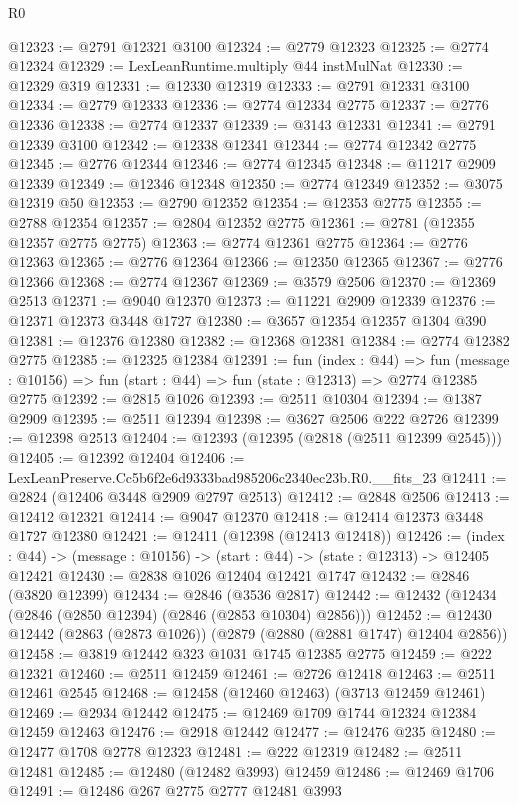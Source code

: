 \begin{lexlean}{R0}
\begin{coremodule}
@12323 := @2791 @12321 @3100
@12324 := @2779 @12323
@12325 := @2774 @12324
@12329 := LexLeanRuntime.multiply @44 instMulNat
@12330 := @12329 @319
@12331 := @12330 @12319
@12333 := @2791 @12331 @3100
@12334 := @2779 @12333
@12336 := @2774 @12334 @2775
@12337 := @2776 @12336
@12338 := @2774 @12337
@12339 := @3143 @12331
@12341 := @2791 @12339 @3100
@12342 := @12338 @12341
@12344 := @2774 @12342 @2775
@12345 := @2776 @12344
@12346 := @2774 @12345
@12348 := @11217 @2909 @12339
@12349 := @12346 @12348
@12350 := @2774 @12349
@12352 := @3075 @12319 @50
@12353 := @2790 @12352
@12354 := @12353 @2775
@12355 := @2788 @12354
@12357 := @2804 @12352 @2775
@12361 := @2781 (@12355 @12357 @2775 @2775)
@12363 := @2774 @12361 @2775
@12364 := @2776 @12363
@12365 := @2776 @12364
@12366 := @12350 @12365
@12367 := @2776 @12366
@12368 := @2774 @12367
@12369 := @3579 @2506
@12370 := @12369 @2513
@12371 := @9040 @12370
@12373 := @11221 @2909 @12339
@12376 := @12371 @12373 @3448 @1727
@12380 := @3657 @12354 @12357 @1304 @390
@12381 := @12376 @12380
@12382 := @12368 @12381
@12384 := @2774 @12382 @2775
@12385 := @12325 @12384
@12391 := fun (index : @44) =>
  fun (message : @10156) => fun (start : @44) => fun (state : @12313) => @2774 @12385 @2775
@12392 := @2815 @1026
@12393 := @2511 @10304
@12394 := @1387 @2909
@12395 := @2511 @12394
@12398 := @3627 @2506 @222 @2726
@12399 := @12398 @2513
@12404 := @12393 (@12395 (@2818 (@2511 @12399 @2545)))
@12405 := @12392 @12404
@12406 := LexLeanPreserve.Cc5b6f2e6d9333bad985206c2340ec23b.R0.__fits_23
@12411 := @2824 (@12406 @3448 @2909 @2797 @2513)
@12412 := @2848 @2506
@12413 := @12412 @12321
@12414 := @9047 @12370
@12418 := @12414 @12373 @3448 @1727 @12380
@12421 := @12411 (@12398 (@12413 @12418))
@12426 := (index : @44) -> (message : @10156) -> (start : @44) -> (state : @12313) -> @12405 @12421
@12430 := @2838 @1026 @12404 @12421 @1747
@12432 := @2846 (@3820 @12399)
@12434 := @2846 (@3536 @2817)
@12442 := @12432 (@12434 (@2846 (@2850 @12394) (@2846 (@2853 @10304) @2856)))
@12452 := @12430 @12442 (@2863 (@2873 @1026)) (@2879 (@2880 (@2881 @1747) @12404 @2856))
@12458 := @3819 @12442 @323 @1031 @1745 @12385 @2775
@12459 := @222 @12321
@12460 := @2511 @12459
@12461 := @2726 @12418
@12463 := @2511 @12461 @2545
@12468 := @12458 (@12460 @12463) (@3713 @12459 @12461)
@12469 := @2934 @12442
@12475 := @12469 @1709 @1744 @12324 @12384 @12459 @12463
@12476 := @2918 @12442
@12477 := @12476 @235
@12480 := @12477 @1708 @2778 @12323
@12481 := @222 @12319
@12482 := @2511 @12481
@12485 := @12480 (@12482 @3993) @12459
@12486 := @12469 @1706
@12491 := @12486 @267 @2775 @2777 @12481 @3993

\end{coremodule}
\end{lexlean}
